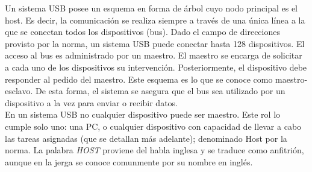 Un sistema USB posee un esquema %
en forma de árbol cuyo nodo principal es el host. Es decir, la comunicación se realiza siempre a través de una única línea a la que se conectan todos los dispositivos (bus). Dado el campo de direcciones provisto por la norma, un sistema USB puede conectar hasta 128 dispositivos. El acceso al bus es administrado por un maestro. El maestro se encarga de solicitar a cada uno de los dispositivos su intervención. Posteriormente, el dispositivo debe responder al pedido del maestro. Este esquema es lo que se conoce como maestro-esclavo. De esta forma, el sistema se asegura que el bus sea utilizado por un dispositivo a la vez para enviar o recibir datos.\\

En un sistema USB no cualquier dispositivo puede ser maestro. Este rol lo cumple solo uno: una PC, o cualquier dispositivo con capacidad de llevar a cabo las tareas asignadas (que se detallan más adelante); denominado Host por la norma. La palabra {\it HOST} proviene del habla inglesa y se traduce como anfitrión, aunque en la jerga se conoce comunmente por su nombre en inglés.\\

